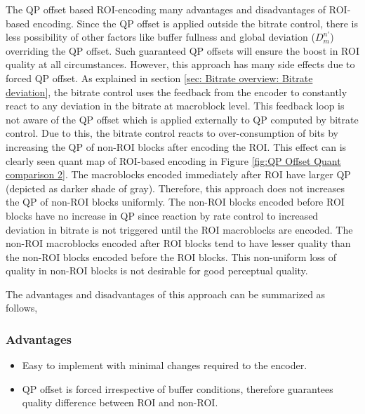 \documentclass[11pt]{article} %
\begin{document}
The QP offset based ROI-encoding many advantages and disadvantages of ROI-based encoding. Since the QP offset is applied outside the bitrate control, there is less possibility of other factors like buffer fullness and global deviation ($D_m^{n'}$) overriding the QP offset. Such guaranteed QP offsets will ensure the boost in ROI quality at all circumstances. However, this approach has many side effects due to forced QP offset. As explained in section \ref{sec: Bitrate overview: Bitrate deviation}, the bitrate control uses the feedback from the encoder to constantly react to any deviation in the bitrate at macroblock level. This feedback loop is not aware of the QP offset which is applied externally to QP computed by bitrate control. Due to this, the bitrate control reacts to over-consumption of bits by increasing the QP of non-ROI blocks after encoding the ROI. This effect can is clearly seen quant map of ROI-based encoding in Figure \ref{fig:QP Offset Quant comparison 2}. The macroblocks encoded immediately after ROI have larger QP (depicted as darker shade of gray). Therefore, this approach does not increases the QP of non-ROI blocks uniformly. The non-ROI blocks encoded before ROI blocks have no increase in QP since reaction by rate control to increased deviation in bitrate is not triggered until the ROI macroblocks are encoded. The non-ROI macroblocks encoded after ROI blocks tend to have lesser quality than the non-ROI blocks encoded before the ROI blocks. This non-uniform loss of quality in non-ROI blocks is not desirable for good perceptual quality. 

The advantages and disadvantages of this approach can be summarized as follows,

\subsubsection*{Advantages}
\begin{itemize}
\item Easy to implement with minimal changes required to the encoder.
\item QP offset is forced irrespective of buffer conditions, therefore guarantees quality difference between ROI and non-ROI.
\end{itemize}
\end{document}
